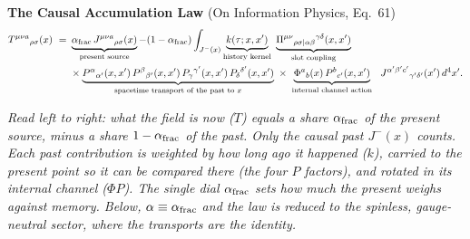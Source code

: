 \documentclass[9pt]{extarticle}
\newcommand{\say}[1]{{\color{note}\footnotesize\textit{#1}\par}}
\begin{document}
\vspace{-2pt}
{\color{ink}\textbf{The Causal Accumulation Law}} {\color{note}\small(On Information Physics, Eq.~61)}
{\small
\[
\begin{aligned}
T^{\mu\nu a}{}_{\rho\sigma}(x)\ =\ &\underbrace{\alpha_{\rm frac}\,J^{\mu\nu a}{}_{\rho\sigma}(x)}_{\text{present source}}-(1-\alpha_{\rm frac})\int_{J^-(x)}\underbrace{k(\tau;x,x')}_{\text{history kernel}}\ \underbrace{\Pi^{\mu\nu}{}_{\rho\sigma|\alpha\beta}{}^{\gamma\delta}(x,x')}_{\text{slot coupling}}\\
&\times\underbrace{P^{\alpha}{}_{\alpha'}(x,x')\,P^{\beta}{}_{\beta'}(x,x')\,P_{\gamma}{}^{\gamma'}(x,x')\,P_{\delta}{}^{\delta'}(x,x')}_{\text{spacetime transport of the past to }x}\ \times\ \underbrace{\Phi^a{}_b(x)\,P^b{}_{c'}(x,x')}_{\text{internal channel action}}\ \ J^{\alpha'\beta'c'}{}_{\gamma'\delta'}(x')\,d^4x'.
\end{aligned}
\]}
\say{Read left to right: what the field is now ($T$) equals a share $\alpha_{\rm frac}$ of the present source, minus a share $1-\alpha_{\rm frac}$ of the past. Only the causal past $J^-(x)$ counts. Each past contribution is weighted by how long ago it happened ($k$), carried to the present point so it can be compared there (the four $P$ factors), and rotated in its internal channel ($\Phi P$). The single dial $\alpha_{\rm frac}$ sets how much the present weighs against memory. Below, $\alpha\equiv\alpha_{\rm frac}$ and the law is reduced to the spinless, gauge-neutral sector, where the transports are the identity.}
\end{document}
